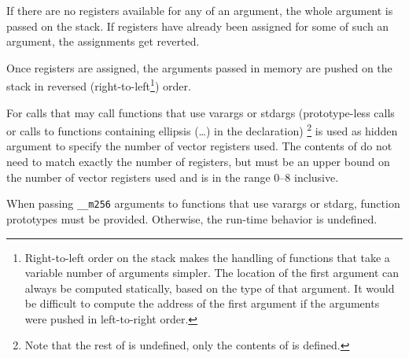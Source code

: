If there are no registers available for any \eightbyte of an
argument, the whole argument is passed on the stack. If registers have
already been assigned for some \eightbytes of such an argument, the
assignments get reverted.

Once registers are assigned, the arguments passed in memory are pushed
on the stack in reversed (right-to-left\footnote{Right-to-left order
  on the stack makes the handling of functions that take a variable
  number of arguments simpler.  The location of the first argument can
  always be computed statically, based on the type of that argument.
  It would be difficult to compute the address of the first argument
  if the arguments were pushed in left-to-right order.}) order.

For calls that may call functions that use varargs or stdargs
(prototype-less calls or calls to functions containing ellipsis
(\dots) in the declaration) %
\footnote{Note that the rest of \RAX is undefined, only the contents
  of  is defined.}
 is used as hidden argument to specify the number of vector registers
 used. The contents of  do not need to
match exactly the number of registers, but must be an upper bound on
the number of vector registers used and is in the range 0--8 inclusive.

When passing \texttt{__m256} arguments to functions that use varargs
or stdarg, function prototypes must be provided.  Otherwise, the
run-time behavior is undefined.


